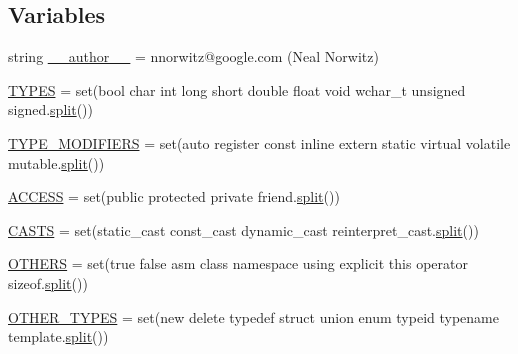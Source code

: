 \subsection*{Variables}
\begin{DoxyCompactItemize}
\item 
string \mbox{\hyperlink{namespacegoogletest-master_1_1googlemock_1_1scripts_1_1generator_1_1cpp_1_1keywords_a7ed4b3471aae320bd1fc6ba704972960}{\+\_\+\+\_\+author\+\_\+\+\_\+}} = \textquotesingle{}nnorwitz@google.\+com (Neal Norwitz)\textquotesingle{}
\item 
\mbox{\hyperlink{namespacegoogletest-master_1_1googlemock_1_1scripts_1_1generator_1_1cpp_1_1keywords_a368ea4b63e6e7fd1470be2a7ff5d151e}{T\+Y\+P\+ES}} = set(\textquotesingle{}bool char int long short double float void wchar\+\_\+t unsigned signed\textquotesingle{}.\mbox{\hyperlink{_input_8h_aec2fd8cd9140a1b535dc54a924396f40}{split}}())
\item 
\mbox{\hyperlink{namespacegoogletest-master_1_1googlemock_1_1scripts_1_1generator_1_1cpp_1_1keywords_a2f3f28ccae1426b1e62d0316200eb91e}{T\+Y\+P\+E\+\_\+\+M\+O\+D\+I\+F\+I\+E\+RS}} = set(\textquotesingle{}auto register const inline extern static virtual volatile mutable\textquotesingle{}.\mbox{\hyperlink{_input_8h_aec2fd8cd9140a1b535dc54a924396f40}{split}}())
\item 
\mbox{\hyperlink{namespacegoogletest-master_1_1googlemock_1_1scripts_1_1generator_1_1cpp_1_1keywords_abfde068913a484374a1899428a0176aa}{A\+C\+C\+E\+SS}} = set(\textquotesingle{}public protected private friend\textquotesingle{}.\mbox{\hyperlink{_input_8h_aec2fd8cd9140a1b535dc54a924396f40}{split}}())
\item 
\mbox{\hyperlink{namespacegoogletest-master_1_1googlemock_1_1scripts_1_1generator_1_1cpp_1_1keywords_a0dd5861d4a309f2bcd39e96d14c633c7}{C\+A\+S\+TS}} = set(\textquotesingle{}static\+\_\+cast const\+\_\+cast dynamic\+\_\+cast reinterpret\+\_\+cast\textquotesingle{}.\mbox{\hyperlink{_input_8h_aec2fd8cd9140a1b535dc54a924396f40}{split}}())
\item 
\mbox{\hyperlink{namespacegoogletest-master_1_1googlemock_1_1scripts_1_1generator_1_1cpp_1_1keywords_abce05e082d0468b9b9689576cffb1bdb}{O\+T\+H\+E\+RS}} = set(\textquotesingle{}true false asm class namespace using explicit this operator sizeof\textquotesingle{}.\mbox{\hyperlink{_input_8h_aec2fd8cd9140a1b535dc54a924396f40}{split}}())
\item 
\mbox{\hyperlink{namespacegoogletest-master_1_1googlemock_1_1scripts_1_1generator_1_1cpp_1_1keywords_ada82536b9102deb6c85f0f7568f5d8c5}{O\+T\+H\+E\+R\+\_\+\+T\+Y\+P\+ES}} = set(\textquotesingle{}new delete typedef struct union enum typeid typename template\textquotesingle{}.\mbox{\hyperlink{_input_8h_aec2fd8cd9140a1b535dc54a924396f40}{split}}())

\end{DoxyCompactItemize}
